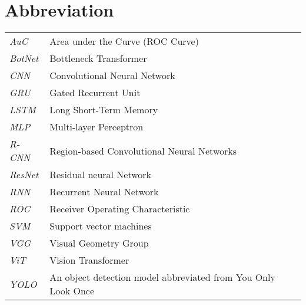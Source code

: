 \newpage
\makeatletter
\let\mcnewpage=\newpage
\newcommand{\TrickSupertabularIntoMulticols}{%
  \renewcommand\newpage{%
    \if@firstcolumn
      \hrule width\linewidth height0pt
      \columnbreak
    \else
      \mcnewpage
    \fi
  }%
}
\makeatother
\chapter{Abbreviation}
\begin{changemargin}{-0.5cm}{0cm}
\begin{multicols*}{2}
\TrickSupertabularIntoMulticols
\begin{supertabular}{>{\em}lp{6.2cm}}
AuC & Area under the Curve (ROC Curve) \\ [.5em]
BotNet & Bottleneck Transformer \\ [.5em]
CNN & Convolutional Neural Network \\ [.5em]
GRU & Gated Recurrent Unit \\ [.5em]
LSTM & Long Short-Term Memory \\ [.5em]
MLP & Multi-layer Perceptron \\ [.5em]
R-CNN & Region-based Convolutional Neural Networks \\ [.5em]
ResNet & Residual neural Network \\ [.5em]
RNN & Recurrent Neural Network \\ [.5em]
ROC & Receiver Operating Characteristic \\ [.5em]
SVM & Support vector machines \\ [.5em]
VGG & Visual Geometry Group \\ [.5em]
ViT & Vision Transformer \\ [.5em]
YOLO & An object detection model abbreviated from You Only Look Once \\ [.5em]
\end{supertabular}
\end{multicols*}
\end{changemargin}